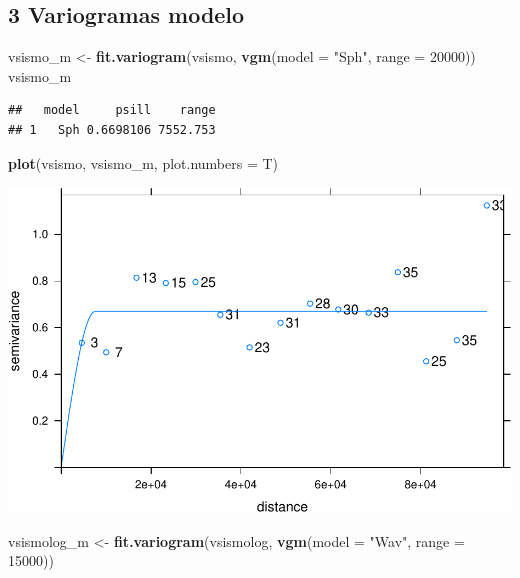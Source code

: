 \documentclass[11pt,]{article}
\newenvironment{Shaded}{\begin{snugshade}}{\end{snugshade}}
\newcommand{\KeywordTok}[1]{\textcolor[rgb]{0.13,0.29,0.53}{\textbf{#1}}}
\newcommand{\DataTypeTok}[1]{\textcolor[rgb]{0.13,0.29,0.53}{#1}}
\newcommand{\DecValTok}[1]{\textcolor[rgb]{0.00,0.00,0.81}{#1}}
\newcommand{\StringTok}[1]{\textcolor[rgb]{0.31,0.60,0.02}{#1}}
\newcommand{\NormalTok}[1]{#1}
\begin{document}
\subsection{3 Variogramas modelo}\label{variogramas-modelo}

\begin{Shaded}
\begin{Highlighting}[]
\NormalTok{vsismo_m <-}\StringTok{ }\KeywordTok{fit.variogram}\NormalTok{(vsismo, }\KeywordTok{vgm}\NormalTok{(}\DataTypeTok{model =} \StringTok{"Sph"}\NormalTok{, }\DataTypeTok{range =} \DecValTok{20000}\NormalTok{))}
\NormalTok{vsismo_m}
\end{Highlighting}
\end{Shaded}

\begin{verbatim}
##   model     psill    range
## 1   Sph 0.6698106 7552.753
\end{verbatim}

\begin{Shaded}
\begin{Highlighting}[]
\KeywordTok{plot}\NormalTok{(vsismo, vsismo_m, }\DataTypeTok{plot.numbers =}\NormalTok{ T)}
\end{Highlighting}
\end{Shaded}

\includegraphics{proyecto_files/figure-latex/unnamed-chunk-26-1.pdf}

\begin{Shaded}
\begin{Highlighting}[]
\NormalTok{vsismolog_m <-}\StringTok{ }\KeywordTok{fit.variogram}\NormalTok{(vsismolog, }\KeywordTok{vgm}\NormalTok{(}\DataTypeTok{model =} \StringTok{"Wav"}\NormalTok{, }\DataTypeTok{range =} \DecValTok{15000}\NormalTok{))}
\end{Highlighting}
\end{Shaded}
\end{document}

